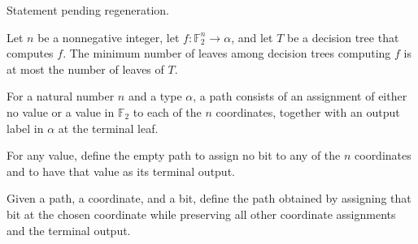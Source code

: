 \begin{theorem}
\leanok
{}
Statement pending regeneration.
\end{theorem}

\begin{theorem}
\leanok
{}
Let $n$ be a nonnegative integer, let $f:\mathbb F_2^n\to\alpha$, and let $T$ be a
decision tree that computes $f$. The minimum number of leaves among decision trees
computing $f$ is at most the number of leaves of $T$.
\end{theorem}

\begin{definition}
\leanok
{}
For a natural number $n$ and a type $\alpha$, a path consists of an assignment of either
no value or a value in $\mathbb{F}_2$ to each of the $n$ coordinates, together with an
output label in $\alpha$ at the terminal leaf.
\end{definition}

\begin{definition}
\leanok
{}
For any value, define the empty path to assign no bit to any of the $n$ coordinates and
to have that value as its terminal output.
\end{definition}

\begin{definition}
\leanok
{}
Given a path, a coordinate, and a bit, define the path obtained by assigning that bit at
the chosen coordinate while preserving all other coordinate assignments and the terminal
output.
\end{definition}

